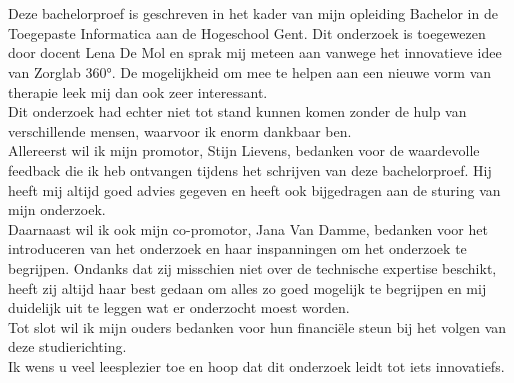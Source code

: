 
\chapter*{}%
\label{ch:voorwoord}

Deze bachelorproef is geschreven in het kader van mijn opleiding Bachelor in de Toegepaste Informatica aan de Hogeschool Gent. Dit onderzoek is toegewezen door docent Lena De Mol en sprak mij meteen aan vanwege het innovatieve idee van Zorglab 360°. De mogelijkheid om mee te helpen aan een nieuwe vorm van therapie leek mij dan ook zeer interessant.\\

Dit onderzoek had echter niet tot stand kunnen komen zonder de hulp van verschillende mensen, waarvoor ik enorm dankbaar ben.\\

Allereerst wil ik mijn promotor, Stijn Lievens, bedanken voor de waardevolle feedback die ik heb ontvangen tijdens het schrijven van deze bachelorproef. Hij heeft mij altijd goed advies gegeven en heeft ook bijgedragen aan de sturing van mijn onderzoek.\\

Daarnaast wil ik ook mijn co-promotor, Jana Van Damme, bedanken voor het introduceren van het onderzoek en haar inspanningen om het onderzoek te begrijpen. Ondanks dat zij misschien niet over de technische expertise beschikt, heeft zij altijd haar best gedaan om alles zo goed mogelijk te begrijpen en mij duidelijk uit te leggen wat er onderzocht moest worden.\\

Tot slot wil ik mijn ouders bedanken voor hun financiële steun bij het volgen van deze studierichting.\\

Ik wens u veel leesplezier toe en hoop dat dit onderzoek leidt tot iets innovatiefs.